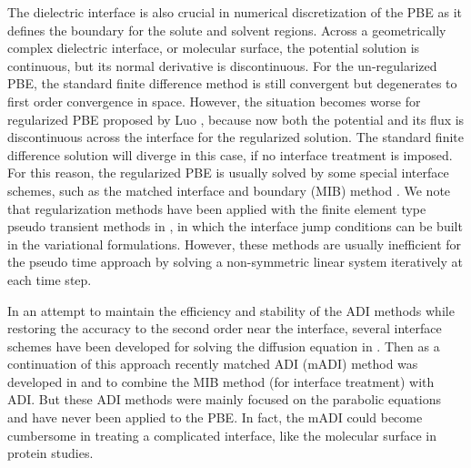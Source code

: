 The dielectric interface is also crucial in numerical discretization of the PBE as it defines the boundary for the solute and solvent regions. Across a geometrically complex dielectric interface, or molecular surface, the potential solution is continuous, but its normal derivative is discontinuous. For the un-regularized PBE, the standard finite difference method is still convergent but degenerates to first order convergence in space. However, the situation becomes worse for regularized PBE proposed by Luo \cite{Cai2009}, because now both the potential and its flux is discontinuous across the interface for the regularized solution. The standard finite difference solution will diverge in this case, if no interface treatment is imposed. For this reason, the regularized PBE is usually solved by some special interface schemes, such as the matched interface and boundary (MIB) method \cite{Geng2007,Chen2011,Yu2007,ZHAO2004,ZHOU2006,ZHOU2006_high,YU2007_3D}. We note that regularization methods have been applied with the finite element type pseudo transient methods in \cite{DENG2018}, in which the interface jump conditions can be built in the variational formulations. However, these methods are usually inefficient for the pseudo time approach by solving a non-symmetric linear system iteratively at each time step. 

In an attempt to maintain the efficiency and stability of the ADI methods while restoring the accuracy to the second order near the interface, several interface schemes have been developed for solving the diffusion equation in \cite{Li1999,Liu2013}. Then as a continuation of this approach recently matched ADI (mADI) method was developed in \cite{Zhao2015} and \cite{Li2017} to combine the MIB method (for interface treatment) with ADI. But these ADI methods were mainly focused on the parabolic equations and have never been applied to the PBE. In fact, the mADI \cite{Zhao2015} could become cumbersome in treating a complicated interface, like the molecular surface in protein studies. 

